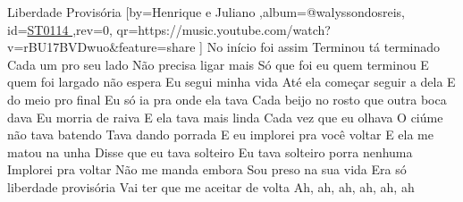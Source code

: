 \beginsong
{Liberdade Provisória %
}[by={Henrique e Juliano %
},album={@walyssondosreis},
id={\href{https://music.youtube.com/watch?v=rBU17BVDwuo&feature=share %
}{ST0114 %
}},rev={0}, %
qr={https://music.youtube.com/watch?v=rBU17BVDwuo&feature=share %
}]
\beginverse
No início foi assim
Terminou tá terminado
Cada um pro seu lado
Não precisa ligar mais
\endverse
\beginverse
Só que foi eu quem terminou
E quem foi largado não espera
Eu segui minha vida
Até ela começar seguir a dela
\endverse
\beginverse
E do meio pro final
Eu só ia pra onde ela tava
Cada beijo no rosto que outra boca dava
Eu morria de raiva
\endverse
\beginverse
E ela tava mais linda
Cada vez que eu olhava
O ciúme não tava batendo
Tava dando porrada
\endverse
\beginchorus
E eu implorei pra você voltar
E ela me matou na unha
Disse que eu tava solteiro
Eu tava solteiro porra nenhuma
Implorei pra voltar
Não me manda embora
Sou preso na sua vida
Era só liberdade provisória
Vai ter que me aceitar de volta
Ah, ah, ah, ah, ah, ah
\endchorus
\vspace{4em} %
\begin{comment}
\lstset{basicstyle=\scriptsize\bf} %
\tab{Solo 1}
\begin{lstlisting}
E|-----------------------------------------------------|
B|-----------------------------------------------------|
G|-----------------------------------------------------|
D|-----------------------------------------------------|
A|-----------------------------------------------------|
E|-----------------------------------------------------|
\end{lstlisting}
\end{comment}
